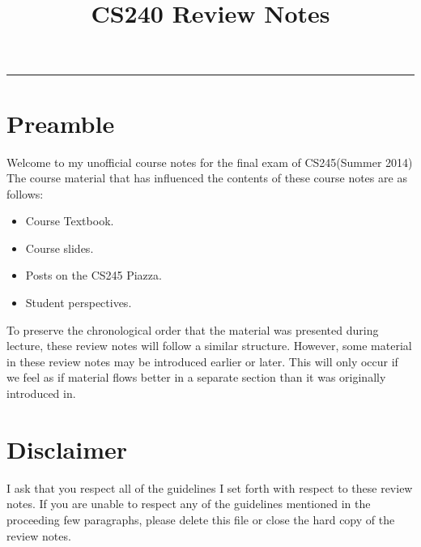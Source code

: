 \documentclass[12pt, twoside, exarticle]{article}
\title{\textbf{CS240 Review Notes}}
\begin{document}
\makeatletter
\hfil\parbox[t]{0.7\textwidth}{\centering\LARGE\bfseries\@title}\par
\kern0.5cm \hrule\kern0.5cm
\makeatother

\section*{Preamble}

Welcome to my unofficial course notes for the final exam of CS245(Summer 2014)\\

The course material that has influenced the contents of these course notes are as follows:

\begin{itemize}

\item Course Textbook.
\item Course slides.
\item Posts on the CS245 Piazza.
\item Student perspectives.

\end{itemize}

To preserve the chronological order that the material was presented during lecture, these review notes will follow a similar structure. However, some material in these review notes may be introduced earlier or later. This will only occur if we feel as if material flows better in a separate section than it was originally introduced in.\\

\clearpage

\section*{Disclaimer}

I ask that you respect all of the guidelines I set forth with respect to these review notes. If you are unable to respect any of the guidelines mentioned in the proceeding few paragraphs, please delete this file or close the hard copy of the review notes.\\
\end{document}
